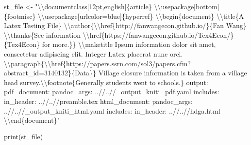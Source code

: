 \documentclass[
]{book}
\newenvironment{Shaded}{\begin{snugshade}}{\end{snugshade}}
\newcommand{\FunctionTok}[1]{\textcolor[rgb]{0.00,0.00,0.00}{#1}}
\newcommand{\NormalTok}[1]{#1}
\newcommand{\OtherTok}[1]{\textcolor[rgb]{0.56,0.35,0.01}{#1}}
\newcommand{\SpecialCharTok}[1]{\textcolor[rgb]{0.00,0.00,0.00}{#1}}
\newcommand{\StringTok}[1]{\textcolor[rgb]{0.31,0.60,0.02}{#1}}
\begin{document}
\begin{Shaded}
\begin{Highlighting}[]
\NormalTok{st\_file }\OtherTok{\textless{}{-}} \StringTok{"}\SpecialCharTok{\textbackslash{}\textbackslash{}}\StringTok{documentclass[12pt,english]\{article\}}
\SpecialCharTok{\textbackslash{}\textbackslash{}}\StringTok{usepackage[bottom]\{footmisc\}}
\SpecialCharTok{\textbackslash{}\textbackslash{}}\StringTok{usepackage[urlcolor=blue]\{hyperref\}}
\SpecialCharTok{\textbackslash{}\textbackslash{}}\StringTok{begin\{document\}}
\SpecialCharTok{\textbackslash{}\textbackslash{}}\StringTok{title\{A Latex Testing File\}}
\SpecialCharTok{\textbackslash{}\textbackslash{}}\StringTok{author\{}\SpecialCharTok{\textbackslash{}\textbackslash{}}\StringTok{href\{http://fanwangecon.github.io/\}\{Fan Wang\} }\SpecialCharTok{\textbackslash{}\textbackslash{}}\StringTok{thanks\{See information }\SpecialCharTok{\textbackslash{}\textbackslash{}}\StringTok{href\{https://fanwangecon.github.io/Tex4Econ/\}\{Tex4Econ\} for more.\}\}}
\SpecialCharTok{\textbackslash{}\textbackslash{}}\StringTok{maketitle}
\StringTok{Ipsum information dolor sit amet, consectetur adipiscing elit. Integer Latex placerat nunc orci.}
\SpecialCharTok{\textbackslash{}\textbackslash{}}\StringTok{paragraph\{}\SpecialCharTok{\textbackslash{}\textbackslash{}}\StringTok{href\{https://papers.ssrn.com/sol3/papers.cfm?abstract\_id=3140132\}\{Data\}\}}
\StringTok{Village closure information is taken from a village head survey.}\SpecialCharTok{\textbackslash{}\textbackslash{}}\StringTok{footnote\{Generally students went to schools.\}}
\StringTok{output:}
\StringTok{  pdf\_document:}
\StringTok{    pandoc\_args: \textquotesingle{}..//..//\_output\_kniti\_pdf.yaml\textquotesingle{}}
\StringTok{    includes:}
\StringTok{      in\_header: \textquotesingle{}..//..//preamble.tex\textquotesingle{}}
\StringTok{  html\_document:}
\StringTok{    pandoc\_args: \textquotesingle{}..//..//\_output\_kniti\_html.yaml\textquotesingle{}}
\StringTok{    includes:}
\StringTok{      in\_header: \textquotesingle{}..//..//hdga.html\textquotesingle{}}
\SpecialCharTok{\textbackslash{}\textbackslash{}}\StringTok{end\{document\}"}

\FunctionTok{print}\NormalTok{(st\_file)}
\end{Highlighting}
\end{Shaded}
\end{document}
